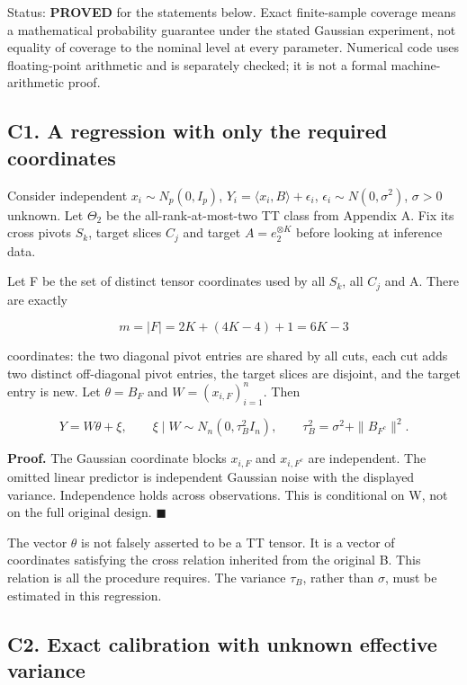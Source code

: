 \documentclass[
  11pt,
]{article}
\begin{document}
Status: \textbf{PROVED} for the statements below. Exact finite-sample
coverage means a mathematical probability guarantee under the stated
Gaussian experiment, not equality of coverage to the nominal level at
every parameter. Numerical code uses floating-point arithmetic and is
separately checked; it is not a formal machine-arithmetic proof.

\subsection{C1. A regression with only the required
coordinates}\label{c1.-a-regression-with-only-the-required-coordinates}

Consider independent \(x_i\sim N_p(0,I_p)\),
\(Y_i=\langle x_i,B\rangle +\epsilon _i\),
\(\epsilon _i\sim N(0,\sigma ^{2})\), \(\sigma >0\) unknown. Let
\(\Theta _2\) be the all-rank-at-most-two TT class from Appendix A. Fix
its cross pivots \(S_k\), target slices \(C_j\) and target
\(A=e_2^{\otimes K}\) before looking at inference data.

Let F be the set of distinct tensor coordinates used by all \(S_k\), all
\(C_j\) and A. There are exactly

\[
 m=|F|=2K+(4K-4)+1=6K-3
\]

coordinates: the two diagonal pivot entries are shared by all cuts, each
cut adds two distinct off-diagonal pivot entries, the target slices are
disjoint, and the target entry is new. Let \(\theta =B_F\) and
\(W=(x_{i,F})_{i=1}^n\). Then

\[
 Y=W\theta+\xi,\qquad
 \xi\mid W\sim N_n(0,\tau_B^2I_n),\qquad
 \tau_B^2=\sigma^2+\|B_{F^c}\|^2.
\]

\textbf{Proof.} The Gaussian coordinate blocks \(x_{i,F}\) and
\(x_{i,F^c}\) are independent. The omitted linear predictor is
independent Gaussian noise with the displayed variance. Independence
holds across observations. This is conditional on W, not on the full
original design. \(\blacksquare\)

The vector \(\theta\) is not falsely asserted to be a TT tensor. It is a
vector of coordinates satisfying the cross relation inherited from the
original B. This relation is all the procedure requires. The variance
\(\tau _B\), rather than \(\sigma\), must be estimated in this
regression.

\subsection{C2. Exact calibration with unknown effective
variance}\label{c2.-exact-calibration-with-unknown-effective-variance}
\end{document}
